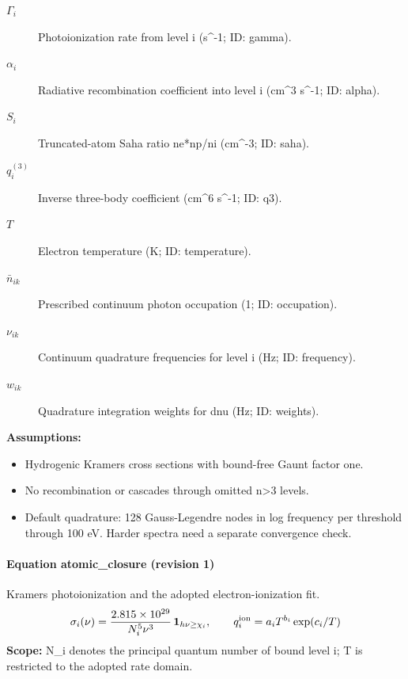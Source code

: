 \begin{description}
\item[$\Gamma_i$] Photoionization rate from level i (s\textasciicircum{}-1; ID: gamma).
\item[$\alpha_i$] Radiative recombination coefficient into level i (cm\textasciicircum{}3 s\textasciicircum{}-1; ID: alpha).
\item[$S_i$] Truncated-atom Saha ratio ne*np/ni (cm\textasciicircum{}-3; ID: saha).
\item[$q_i^{(3)}$] Inverse three-body coefficient (cm\textasciicircum{}6 s\textasciicircum{}-1; ID: q3).
\item[$T$] Electron temperature (K; ID: temperature).
\item[$\bar n_{ik}$] Prescribed continuum photon occupation (1; ID: occupation).
\item[$\nu_{ik}$] Continuum quadrature frequencies for level i (Hz; ID: frequency).
\item[$w_{ik}$] Quadrature integration weights for dnu (Hz; ID: weights).
\end{description}

\noindent\textbf{Assumptions:}
\begin{itemize}
\item Hydrogenic Kramers cross sections with bound-free Gaunt factor one.
\item No recombination or cascades through omitted n>3 levels.
\item Default quadrature: 128 Gauss-Legendre nodes in log frequency per threshold through 100 eV. Harder spectra need a separate convergence check.
\end{itemize}

\paragraph{Equation atomic\_closure (revision 1)}
Kramers photoionization and the adopted electron-ionization fit.
\begin{equation}
\begin{aligned}
\sigma_i(\nu)=\frac{2.815\times10^{29}}{N_i^{5}\nu^3}\,\mathbf 1_{h\nu\ge\chi_i},\qquad q_i^{\rm ion}=a_i T^{b_i}\exp(c_i/T)
\end{aligned}
\label{eq:escape.hydrogen_5f_nlte:atomic_5f_closure:1}
\end{equation}
\noindent\textbf{Scope:} N\_i denotes the principal quantum number of bound level i; T is restricted to the adopted rate domain.

